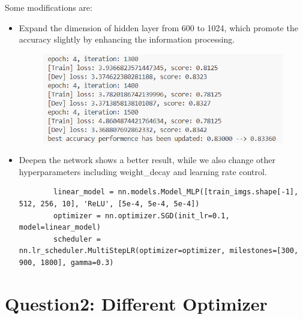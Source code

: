 \documentclass[]{article}
\begin{document}
Some modifications are:
\begin{itemize}
	\item Expand the dimension of hidden layer from 600 to 1024, which promote the accuracy slightly by enhancing the information processing.
	\begin{figure}
		\centering
		\includegraphics[width=0.7\linewidth]{Q1_2}
		\caption{}
		\label{fig:q12}
	\end{figure}
	
	\item Deepen the network shows a better result, while we also change other hyperparameters including weight\_decay and learning rate control.
	\begin{lstlisting}
		linear_model = nn.models.Model_MLP([train_imgs.shape[-1], 512, 256, 10], 'ReLU', [5e-4, 5e-4, 5e-4])
		optimizer = nn.optimizer.SGD(init_lr=0.1, model=linear_model)
		scheduler = nn.lr_scheduler.MultiStepLR(optimizer=optimizer, milestones=[300, 900, 1800], gamma=0.3)
	\end{lstlisting}
\end{itemize}
\section{Question2: Different Optimizer}
\end{document}
